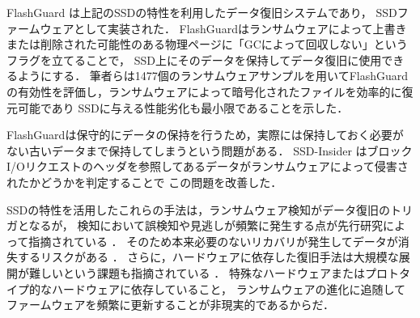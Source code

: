FlashGuard \cite{huang2017flashguard} は上記のSSDの特性を利用したデータ復旧システムであり，
SSDファームウェアとして実装された．
FlashGuardはランサムウェアによって上書きまたは削除された可能性のある物理ページに「GCによって回収しない」というフラグを立てることで，
SSD上にそのデータを保持してデータ復旧に使用できるようにする．
筆者らは1477個のランサムウェアサンプルを用いてFlashGuardの有効性を評価し，ランサムウェアによって暗号化されたファイルを効率的に復元可能であり
SSDに与える性能劣化も最小限であることを示した．

FlashGuardは保守的にデータの保持を行うため，実際には保持しておく必要がない古いデータまで保持してしまうという問題がある．
SSD-Insider \cite{baek2018ssd} はブロックI/Oリクエストのヘッダを参照してあるデータがランサムウェアによって侵害されたかどうかを判定することで
この問題を改善した．

SSDの特性を活用したこれらの手法は，ランサムウェア検知がデータ復旧のトリガとなるが，
検知において誤検知や見逃しが頻繁に発生する点が先行研究によって指摘されている \cite{han2020effectiveness}．
そのため本来必要のないリカバリが発生してデータが消失するリスクがある \cite{css2024-enomoto}．
さらに，ハードウェアに依存した復旧手法は大規模な展開が難しいという課題も指摘されている \cite{wang2024ransom}．
特殊なハードウェアまたはプロトタイプ的なハードウェアに依存していること，
ランサムウェアの進化に追随してファームウェアを頻繁に更新することが非現実的であるからだ．

